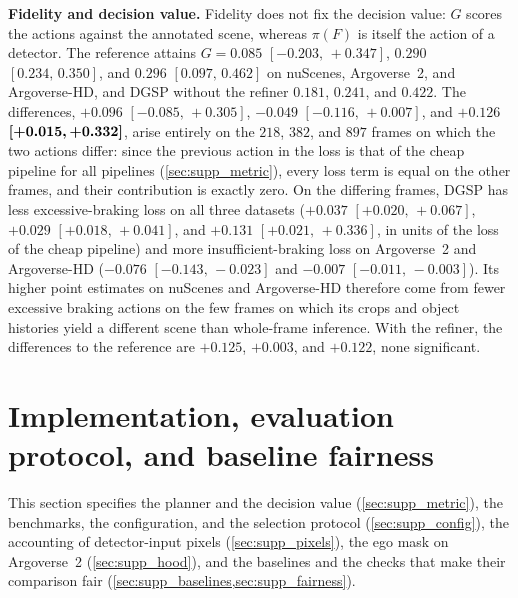 \documentclass[10pt,letterpaper]{article}
\newcommand{\method}{DGSP\xspace}
\newcommand{\full}{F}
\newcommand{\policy}{\pi}
\newcommand{\G}{G}
\newcommand{\ci}[2]{[#1,\allowbreak\,#2]}
\newcommand{\best}[1]{\textbf{#1}}
\theoremstyle{remark}
\theoremstyle{plain}
\theoremstyle{definition}
\begin{document}
\noindent\textbf{Fidelity and decision value.}\label{sec:supp_fidelity_G}
Fidelity does not fix the decision value: $\G$ scores the actions against the annotated scene, whereas $\policy(\full)$ is itself the action of a detector.
The reference attains $\G=0.085$ $\ci{-0.203}{+0.347}$, $0.290$ $\ci{0.234}{0.350}$, and $0.296$ $\ci{0.097}{0.462}$ on nuScenes, Argoverse~2, and Argoverse-HD, and \method without the refiner $0.181$, $0.241$, and $0.422$.
The differences, $+0.096$ $\ci{-0.085}{+0.305}$, $-0.049$ $\ci{-0.116}{+0.007}$, and $+0.126$ $\best{\ci{+0.015}{+0.332}}$, arise entirely on the $218$, $382$, and $897$ frames on which the two actions differ: since the previous action in the loss is that of the cheap pipeline for all pipelines (\cref{sec:supp_metric}), every loss term is equal on the other frames, and their contribution is exactly zero.
On the differing frames, \method has less excessive-braking loss on all three datasets ($+0.037$ $\ci{+0.020}{+0.067}$, $+0.029$ $\ci{+0.018}{+0.041}$, and $+0.131$ $\ci{+0.021}{+0.336}$, in units of the loss of the cheap pipeline) and more insufficient-braking loss on Argoverse~2 and Argoverse-HD ($-0.076$ $\ci{-0.143}{-0.023}$ and $-0.007$ $\ci{-0.011}{-0.003}$).
Its higher point estimates on nuScenes and Argoverse-HD therefore come from fewer excessive braking actions on the few frames on which its crops and object histories yield a different scene than whole-frame inference.
With the refiner, the differences to the reference are $+0.125$, $+0.003$, and $+0.122$, none significant.

\section{Implementation, evaluation protocol, and baseline fairness}
\label{sec:supp_impl}

This section specifies the planner and the decision value (\cref{sec:supp_metric}), the benchmarks, the configuration, and the selection protocol (\cref{sec:supp_config}), the accounting of detector-input pixels (\cref{sec:supp_pixels}), the ego mask on Argoverse~2 (\cref{sec:supp_hood}), and the baselines and the checks that make their comparison fair (\cref{sec:supp_baselines,sec:supp_fairness}).
\end{document}
